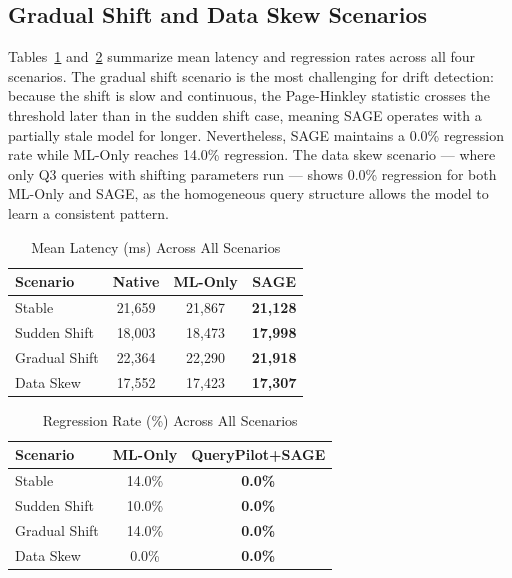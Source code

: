 \documentclass[conference]{IEEEtran}
\begin{document}
\subsection*{Gradual Shift and Data Skew Scenarios}

Tables~\ref{tab:all_scenarios} and~\ref{tab:regression} summarize mean latency
and regression rates across all four scenarios. The gradual shift scenario is the most challenging
for drift detection: because the shift is slow and continuous, the Page-Hinkley
statistic crosses the threshold later than in the sudden shift case, meaning
SAGE operates with a partially stale model for longer. Nevertheless, SAGE
maintains a 0.0\% regression rate while ML-Only reaches 14.0\% regression.
The data skew scenario — where only Q3 queries with shifting parameters run
— shows 0.0\% regression for both ML-Only and SAGE, as the homogeneous query
structure allows the model to learn a consistent pattern.

\begin{table}[htbp]
\centering
\caption{Mean Latency (ms) Across All Scenarios}
\renewcommand{\arraystretch}{1.3}
\begin{tabular}{|l|c|c|c|}
\hline
\textbf{Scenario} & \textbf{Native} & \textbf{ML-Only} & \textbf{SAGE} \\
\hline
Stable        & 21,659 & 21,867 & \textbf{21,128} \\
Sudden Shift  & 18,003 & 18,473 & \textbf{17,998} \\
Gradual Shift & 22,364 & 22,290 & \textbf{21,918} \\
Data Skew     & 17,552 & 17,423 & \textbf{17,307} \\
\hline
\end{tabular}
\label{tab:all_scenarios}
\end{table}

\begin{table}[htbp]
\centering
\caption{Regression Rate (\%) Across All Scenarios}
\renewcommand{\arraystretch}{1.3}
\begin{tabular}{|l|c|c|}
\hline
\textbf{Scenario} & \textbf{ML-Only} & \textbf{QueryPilot+SAGE} \\
\hline
Stable        & 14.0\% & \textbf{0.0\%} \\
Sudden Shift  & 10.0\% & \textbf{0.0\%} \\
Gradual Shift & 14.0\% & \textbf{0.0\%} \\
Data Skew     &  0.0\% & \textbf{0.0\%} \\
\hline
\end{tabular}
\label{tab:regression}
\end{table}
\end{document}

